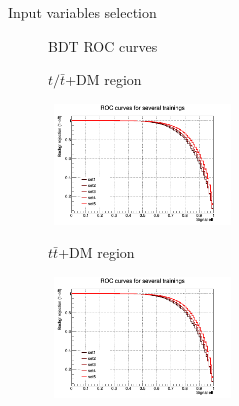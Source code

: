 \documentclass[8pt]{beamer}
\begin{document}
\begin{frame}{Input variables selection}
\justifying

\begin{figure}[htbp]
\centering
\begin{block}{ \centering BDT ROC curves}\end{block}
\begin{minipage}[b]{.48\textwidth}
\begin{center} \vspace{-8pt}
\begin{block}{\centering $t/\bar t$+DM region}\end{block}
\includegraphics[width=5cm, height=3.2cm]{figs/BDT_input_ST.png}
\end{center}
\end{minipage}\hfill
\begin{minipage}[b]{.48\textwidth}
\begin{center}  \vspace{-8pt}
\begin{block}{\centering $t \bar t$+DM region}\end{block}
\includegraphics[width=5cm, height=3.2cm]{figs/BDT_input_TTbar.png}
\end{center}
\end{minipage}\hfill


\end{figure}
\end{frame}
\end{document}
